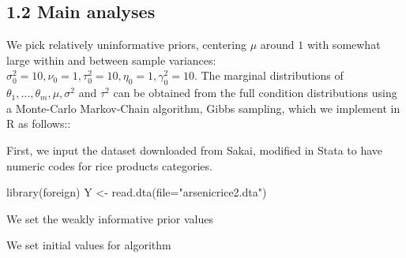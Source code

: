 \documentclass[]{article}
\newenvironment{Shaded}{\begin{snugshade}}{\end{snugshade}}
\newcommand{\KeywordTok}[1]{\textcolor[rgb]{0.94,0.87,0.69}{{#1}}}
\newcommand{\DataTypeTok}[1]{\textcolor[rgb]{0.87,0.87,0.75}{{#1}}}
\newcommand{\DecValTok}[1]{\textcolor[rgb]{0.86,0.86,0.80}{{#1}}}
\newcommand{\StringTok}[1]{\textcolor[rgb]{0.80,0.58,0.58}{{#1}}}
\newcommand{\CommentTok}[1]{\textcolor[rgb]{0.50,0.62,0.50}{{#1}}}
\newcommand{\OtherTok}[1]{\textcolor[rgb]{0.94,0.94,0.56}{{#1}}}
\newcommand{\NormalTok}[1]{\textcolor[rgb]{0.80,0.80,0.80}{{#1}}}
\begin{document}
\subsection{1.2 Main analyses}

We pick relatively uninformative priors, centering \(\mu\) around \(1\)
with somewhat large within and between sample variances:
\(\sigma^2_0 = 10, \nu_0 = 1, \tau_0^2 = 10, \eta_0=1, \gamma_0^2 = 10\).
The marginal distributions of
\(\theta_1, \ldots, \theta_m, \mu, \sigma^2\) and \(\tau^2\) can be
obtained from the full condition distributions using a Monte-Carlo
Markov-Chain algorithm, Gibbs sampling, which we implement in R as
follows::\newline

First, we input the dataset downloaded from Sakai, modified in Stata to
have numeric codes for rice products categories.

\begin{Shaded}
\begin{Highlighting}[]
\KeywordTok{library}\NormalTok{(foreign)}
\NormalTok{Y <-}\StringTok{ }\KeywordTok{read.dta}\NormalTok{(}\DataTypeTok{file=}\StringTok{"arsenicrice2.dta"}\NormalTok{)}
\end{Highlighting}
\end{Shaded}

We set the weakly informative prior values

\begin{Shaded}
\end{Shaded}

We set initial values for algorithm

\begin{Shaded}
\end{Shaded}
\end{document}
